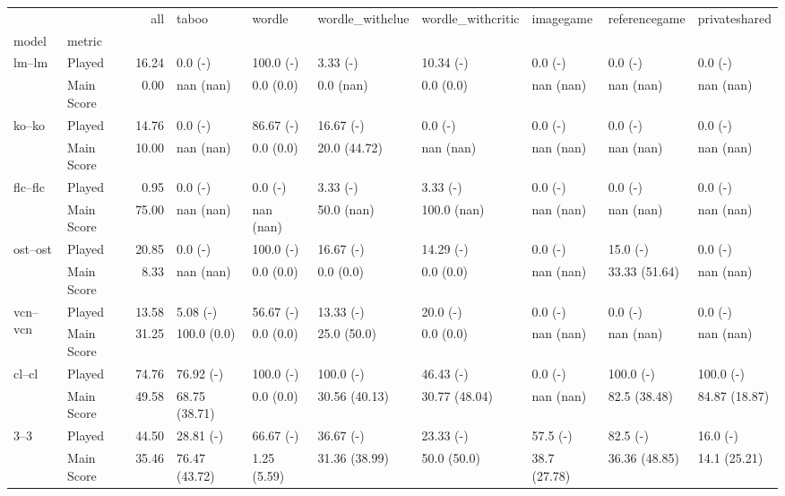 \begin{tabular}{llrlllllll}
\toprule
 &  & all & taboo & wordle & wordle_withclue & wordle_withcritic & imagegame & referencegame & privateshared \\
model & metric &  &  &  &  &  &  &  &  \\
\midrule
\multirow[t]{2}{*}{lm--lm} & Played & 16.24 & 0.0 (-) & 100.0 (-) & 3.33 (-) & 10.34 (-) & 0.0 (-) & 0.0 (-) & 0.0 (-) \\
 & Main Score & 0.00 & nan (nan) & 0.0 (0.0) & 0.0 (nan) & 0.0 (0.0) & nan (nan) & nan (nan) & nan (nan) \\
\cline{1-10}
\multirow[t]{2}{*}{ko--ko} & Played & 14.76 & 0.0 (-) & 86.67 (-) & 16.67 (-) & 0.0 (-) & 0.0 (-) & 0.0 (-) & 0.0 (-) \\
 & Main Score & 10.00 & nan (nan) & 0.0 (0.0) & 20.0 (44.72) & nan (nan) & nan (nan) & nan (nan) & nan (nan) \\
\cline{1-10}
\multirow[t]{2}{*}{flc--flc} & Played & 0.95 & 0.0 (-) & 0.0 (-) & 3.33 (-) & 3.33 (-) & 0.0 (-) & 0.0 (-) & 0.0 (-) \\
 & Main Score & 75.00 & nan (nan) & nan (nan) & 50.0 (nan) & 100.0 (nan) & nan (nan) & nan (nan) & nan (nan) \\
\cline{1-10}
\multirow[t]{2}{*}{ost--ost} & Played & 20.85 & 0.0 (-) & 100.0 (-) & 16.67 (-) & 14.29 (-) & 0.0 (-) & 15.0 (-) & 0.0 (-) \\
 & Main Score & 8.33 & nan (nan) & 0.0 (0.0) & 0.0 (0.0) & 0.0 (0.0) & nan (nan) & 33.33 (51.64) & nan (nan) \\
\cline{1-10}
\multirow[t]{2}{*}{vcn--vcn} & Played & 13.58 & 5.08 (-) & 56.67 (-) & 13.33 (-) & 20.0 (-) & 0.0 (-) & 0.0 (-) & 0.0 (-) \\
 & Main Score & 31.25 & 100.0 (0.0) & 0.0 (0.0) & 25.0 (50.0) & 0.0 (0.0) & nan (nan) & nan (nan) & nan (nan) \\
\cline{1-10}
\multirow[t]{2}{*}{cl--cl} & Played & 74.76 & 76.92 (-) & 100.0 (-) & 100.0 (-) & 46.43 (-) & 0.0 (-) & 100.0 (-) & 100.0 (-) \\
 & Main Score & 49.58 & 68.75 (38.71) & 0.0 (0.0) & 30.56 (40.13) & 30.77 (48.04) & nan (nan) & 82.5 (38.48) & 84.87 (18.87) \\
\cline{1-10}
\multirow[t]{2}{*}{3--3} & Played & 44.50 & 28.81 (-) & 66.67 (-) & 36.67 (-) & 23.33 (-) & 57.5 (-) & 82.5 (-) & 16.0 (-) \\
 & Main Score & 35.46 & 76.47 (43.72) & 1.25 (5.59) & 31.36 (38.99) & 50.0 (50.0) & 38.7 (27.78) & 36.36 (48.85) & 14.1 (25.21) \\

\end{tabular}
